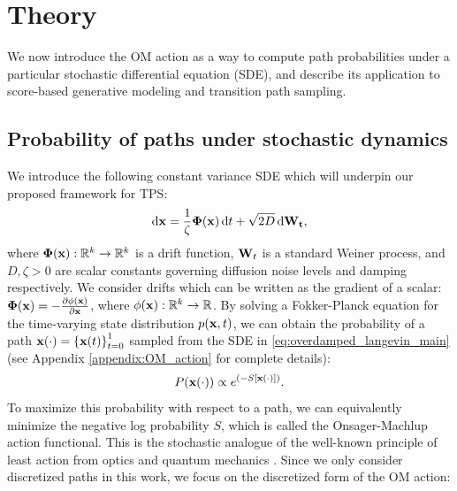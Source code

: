 \vspace{-5pt}
\section{Theory}
We now introduce the OM action as a way to compute path probabilities under a particular stochastic differential equation (SDE), and describe its application to score-based generative modeling and transition path sampling.
\vspace{-5pt}
\subsection{Probability of paths under stochastic dynamics} 
\label{sec:stoch_dyn}
We introduce the following constant variance SDE which will underpin our proposed framework for TPS: 
\begin{equation}
    \label{eq:overdamped_langevin_main}
    \odif{\xx} = \frac{1}{\zeta}\mathbf{\Phi(x)}\odif{t} + \sqrt{2 D} \odif{\mathbf{W_t}},
\end{equation}
where $\mathbf{\Phi}(\mathbf{x}) : \mathbb{R}^k \to \mathbb{R}^k$ is a drift function, $\mathbf{W}_t$ is a standard Weiner process, and $D, \zeta > 0$ are scalar constants governing diffusion noise levels and damping respectively. We consider drifts which can be written as the gradient of a scalar: $\mathbf{\Phi(x)} = -\frac{\partial \phi(\mathbf{x})}{\partial \mathbf{x}}$, where $\phi(\mathbf{x}) : \mathbb{R}^k \to \mathbb{R}$. By solving a Fokker-Planck equation for the time-varying state distribution $p(\mathbf{x}, t)$, we can obtain the probability of a path $\mathbf{x}(\cdot) = \left \{ \mathbf{x}(t) \right \}_{t=0}^1$ sampled from the SDE in \eqref{eq:overdamped_langevin_main} (see Appendix \ref{appendix:OM_action} for complete details):
\begin{equation}
\label{eq:path_probability_main}
    P( \mathbf{x}(\cdot)) \propto e^{\left(-S[ \mathbf{x}(\cdot)]\right)}.
\end{equation}
To maximize this probability with respect to a path, we can equivalently minimize the negative log probability $S$, which is called the Onsager-Machlup action functional. This is the stochastic analogue of the well-known principle of least action from optics and quantum mechanics \cite{rojo2018principle}. Since we only consider discretized paths in this work, we focus on the discretized form of the OM action:
